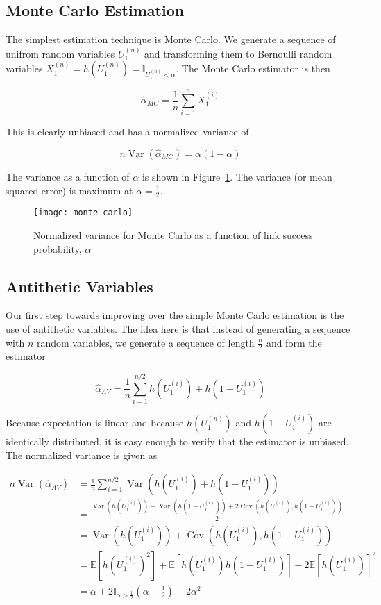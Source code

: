 \documentclass[11pt]{article}
\DeclareMathOperator{\var}{Var}
\DeclareMathOperator{\cov}{Cov}
\begin{document}
\subsection{Monte Carlo Estimation}
The simplest estimation technique is Monte Carlo. We generate a sequence of unifrom random variables $U_{1}^{(n)}$ and transforming them to Bernoulli random variables $X_{1}^{(n)} = h(U_{1}^{(n)}) = \mathbb{I}_{U_{1}^{(n)} < \alpha}$. The Monte Carlo estimator is then

\begin{equation}
\hat{\alpha}_{MC} = \frac{1}{n}\displaystyle\sum_{i=1}^{n}X_{1}^{(i)}
\end{equation}

This is clearly unbiased and has a normalized variance of

\begin{equation}
n\var\left(\hat{\alpha}_{MC}\right) = \alpha(1-\alpha)
\end{equation}

The variance as a function of $\alpha$ is shown in Figure~\ref{fig:mc}. The variance (or mean squared error) is maximum at $\alpha = \frac{1}{2}$.
\begin{figure}[ht!]
\centering
\texttt{[image: monte\_carlo]}
\caption{Normalized variance for Monte Carlo as a function of link success probability, $\alpha$}\label{fig:mc}
\end{figure}

\subsection{Antithetic Variables}
Our first step towards improving over the simple Monte Carlo estimation is the use of antithetic variables\cite{ross}. The idea here is that instead of generating a sequence with $n$ random variables, we generate a sequence of length $\frac{n}{2}$ and form the estimator

\begin{equation}
\hat{\alpha}_{AV} = \frac{1}{n}\displaystyle\sum_{i=1}^{n/2}h(U_{1}^{(i)})+h(1 - U_{1}^{(i)})
\end{equation}

Because expectation is linear and because $h(U_{1}^{(n)})$ and $h(1-U_{1}^{(i)})$ are identically distributed, it is easy enough to verify that the estimator is unbiased. The normalized variance is given as

\begin{align*}
n\var\left(\hat{\alpha}_{AV}\right) &= \frac{1}{n}\sum_{i=1}^{n/2}\var\left(h(U_{1}^{(i)}) + h(1-U_{1}^{(i)})\right)\\
&=\frac{\var\left(h(U_{1}^{(i)})\right) + \var\left(h(1-U_{1}^{(i)})\right) + 2\cov\left(h(U_{1}^{(i)}),h(1-U_{1}^{(i)})\right)}{2}\\
&=\var\left(h(U_{1}^{(i)})\right) + \cov\left(h(U_{1}^{(i)}),h(1-U_{1}^{(i)})\right)\\
&=\mathbb{E}\left[h(U_{1}^{(i)})^2\right] + \mathbb{E}\left[h(U_{1}^{(i)})h(1-U_{1}^{(i)})\right] - 2\mathbb{E}\left[h(U_{1}^{(i)})\right]^{2}\\
&=\alpha+ 2\mathbb{I}_{\alpha > \frac{1}{2}}(\alpha-\frac{1}{2})-2\alpha^{2}
\end{align*}
\end{document}
